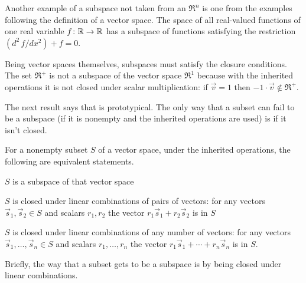 \begin{example}
Another example of a subspace not taken from an $\Re^n$ is 
one from the examples following the definition of a vector space.
The space of all real-valued functions of one real variable 
$\mbox{$f\colon \mathbb{R}\to \mathbb{R}$}$ has a subspace of functions satisfying
the restriction $(d^2\,f/dx^2)+f=0$.
\end{example}

\begin{example}  \label{cex:RPlusNotSubSp}
Being vector spaces themselves, subspaces must satisfy the closure
conditions.
The set \( \Re^+ \) is not a subspace of the vector space \( \Re^1 \)
because with the inherited operations it is not closed under scalar
multiplication: if \( \vec{v}=1 \) then \( -1\cdot\vec{v}\not\in\Re^+ \).
\end{example}

The next result says that  is prototypical. 
The only way that a subset can fail to be a subspace 
(if it is nonempty and the inherited operations are used)
is if it isn't closed.

\begin{lemma}     \label{th:SubspIffClosed} 
For a nonempty subset \( S \) of a vector space, under the inherited 
operations, the following are equivalent 
statements.   %
\begin{tfae}
  \item \( S \) is a subspace of that vector space
  \item \( S \) is closed under linear combinations of pairs of vectors:
    for any vectors \( \vec{s}_1,\vec{s}_2\in S \) and scalars \( r_1,r_2 \)
    the vector \( r_1\vec{s}_1+r_2\vec{s}_2 \) is in \( S \)
  \item \( S \) is closed under linear combinations of any number of vectors:
    for any vectors \( \vec{s}_1,\ldots,\vec{s}_n\in S \) and scalars
    \( r_1, \ldots,r_n \)
    the vector \( r_1\vec{s}_1+\cdots+r_n\vec{s}_n \) is in \( S \).
\end{tfae}
\end{lemma}
Briefly, the way that a subset gets to be a 
subspace is by being closed under linear combinations.

